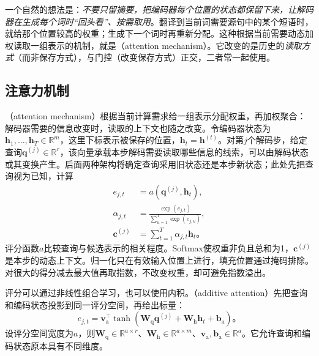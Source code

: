 一个自然的想法是：\emph{不要只留摘要，把编码器每个位置的状态都保留下来，让解码器在生成每个词时“回头看”、按需取用}。翻译到当前词需要源句中的某个短语时，就给那个位置较高的权重；生成下一个词时再重新分配。这种根据当前需要动态加权读取一组表示的机制，就是（attention mechanism）。它改变的是历史的\emph{读取方式}（而非保存方式），与门控（改变保存方式）正交，二者常一起使用。

\subsection{注意力机制}
\label{sec:rnn-attention-mechanism}

（attention mechanism）根据当前计算需求给一组表示分配权重，再加权聚合：解码器需要的信息改变时，读取的上下文也随之改变。令编码器状态为$\bm{h}_1,\ldots,\bm{h}_T\in\mathbb{R}^{m}$，这里下标表示被保存的位置，$\bm{h}_t=\bm{h}^{(t)}$。对第$j$个解码步，给定查询$\bm{q}^{(j)}\in\mathbb{R}^{r}$，该向量承载本步解码需要读取哪些信息的线索，可以由解码状态或其变换产生。后面两种架构将确定查询采用旧状态还是本步新状态；此处先把查询视为已知，计算
\begin{equation}
  \begin{aligned}
    e_{j,t}&=a(\bm{q}^{(j)},\bm{h}_t),\\
    \alpha_{j,t}&=\frac{\exp(e_{j,t})}
       {\sum_{u=1}^{T}\exp(e_{j,u})},\\
    \bm{c}^{(j)}&=\sum_{t=1}^{T}\alpha_{j,t}\bm{h}_t\text{。}
  \end{aligned}
  \label{eq:rnn-attention}
\end{equation}
评分函数$a$比较查询与候选表示的相关程度。Softmax使权重非负且总和为1，$\bm{c}^{(j)}$是本步的动态上下文。归一化只在有效输入位置上进行，填充位置通过掩码排除。对很大的得分减去最大值再取指数，不改变权重，却可避免指数溢出。

评分可以通过非线性组合学习，也可以使用内积。（additive attention）先把查询和编码状态投影到同一评分空间，再给出标量：
\begin{equation}
  e_{j,t}=\bm{v}_{\mathrm{a}}^{\top}\tanh\!\left(
     \bm{W}_{\mathrm{q}}\bm{q}^{(j)}
     +\bm{W}_{\mathrm{h}}\bm{h}_t+\bm{b}_{\mathrm{a}}\right)\text{。}
  \label{eq:rnn-additive-attention}
\end{equation}
设评分空间宽度为$a$，则$\bm{W}_{\mathrm{q}}\in\mathbb{R}^{a\times r}$、$\bm{W}_{\mathrm{h}}\in\mathbb{R}^{a\times m}$、$\bm{v}_{\mathrm{a}},\bm{b}_{\mathrm{a}}\in\mathbb{R}^{a}$。它允许查询和编码状态原本具有不同维度。

